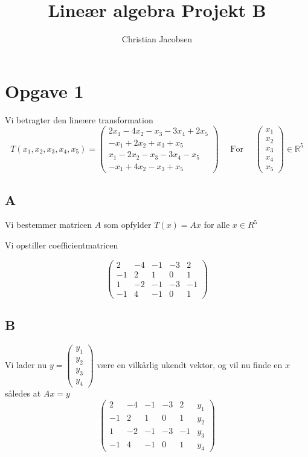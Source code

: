 \documentclass[11pt]{article}
\title{Lineær algebra Projekt B}
\author{Christian Jacobsen}
\begin{document}
    
    
    \maketitle
    \hypertarget{opgave-1}{%
\section{Opgave 1}\label{opgave-1}}

Vi betragter den lineære transformation \[ 
T(x_1,x_2,x_3,x_4,x_5) = 
\begin{pmatrix} 
2x_1-4x_2-x_3-3x_4+2x_5\\
-x_1+2x_2+x_3+x_5\\
x_1-2x_2-x_3-3x_4-x_5\\
-x_1+4x_2-x_3+x_5
\end{pmatrix} \quad \text{ For }\quad 
\begin{pmatrix}x_1 \\ x_2\\ x_3\\ x_4\\ x_5\end{pmatrix} \in \mathbb{R}^5\]

    \hypertarget{a}{%
\subsection{A}\label{a}}

Vi bestemmer matricen \(A\) som opfylder \(T(x) = Ax\) for alle
\(x \in R^5\)

    Vi opstiller coefficientmatricen

    \[
\left(\begin{array}{rrrrr}
         2 & -4 & -1 & -3 & 2 \\
         -1 & 2 & 1 & 0 & 1 \\
         1 & -2 & -1 & -3 & -1 \\
         -1 & 4 & -1 & 0 & 1
\end{array}\right)
\]
            
    \hypertarget{b}{%
\subsection{B}\label{b}}

Vi lader nu $ y=\begin{pmatrix}y_1 \\
y_2 \\ y_3 \\ y_4
\end{pmatrix}$ være en vilkårlig ukendt vektor, og vil
nu finde en \(x\) således at \(Ax = y\)
\[
\left(
\begin{array}{rrrrrr}
         2 & -4 & -1 & -3 & 2 & y_{1} \\
         -1 & 2 & 1 & 0 & 1 & y_{2} \\
         1 & -2 & -1 & -3 & -1 & y_{3} \\
         -1 & 4 & -1 & 0 & 1 & y_{4}
         \end{array}\right)
\]
\end{document}
